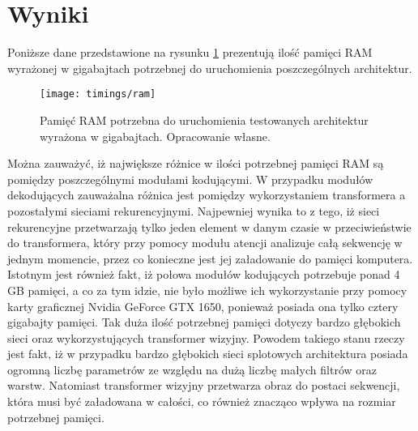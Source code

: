 \newpage %

\section{Wyniki}
Poniższe dane przedstawione na rysunku \ref{fig:memory} prezentują ilość pamięci RAM wyrażonej w gigabajtach potrzebnej do uruchomienia poszczególnych architektur.
\begin{figure}[H]
    \centering
    \texttt{[image: timings/ram]}
    \caption{Pamięć RAM potrzebna do uruchomienia testowanych architektur wyrażona w gigabajtach. Opracowanie własne.}
    \label{fig:memory}
\end{figure}
\noindent Można zauważyć, iż największe różnice w ilości potrzebnej pamięci RAM są pomiędzy poszczególnymi modułami kodującymi. W przypadku modułów dekodujących zauważalna różnica jest pomiędzy wykorzystaniem transformera a pozostałymi sieciami rekurencyjnymi. Najpewniej wynika to z tego, iż sieci rekurencyjne przetwarzają tylko jeden element w danym czasie w przeciwieństwie do transformera, który przy pomocy modułu atencji analizuje całą sekwencję w jednym momencie, przez co konieczne jest jej załadowanie do pamięci komputera. Istotnym jest również fakt, iż połowa modułów kodujących potrzebuje ponad 4 GB pamięci, a co za tym idzie, nie było możliwe ich wykorzystanie przy pomocy karty graficznej Nvidia GeForce GTX 1650, ponieważ posiada ona tylko cztery gigabajty pamięci. Tak duża ilość potrzebnej pamięci dotyczy bardzo głębokich sieci oraz wykorzystujących transformer wizyjny. Powodem takiego stanu rzeczy jest fakt, iż w przypadku bardzo głębokich sieci splotowych architektura posiada ogromną liczbę parametrów ze względu na dużą liczbę małych filtrów oraz warstw. Natomiast transformer wizyjny przetwarza obraz do postaci sekwencji, która musi być załadowana w całości, co również znacząco wpływa na rozmiar potrzebnej pamięci.

